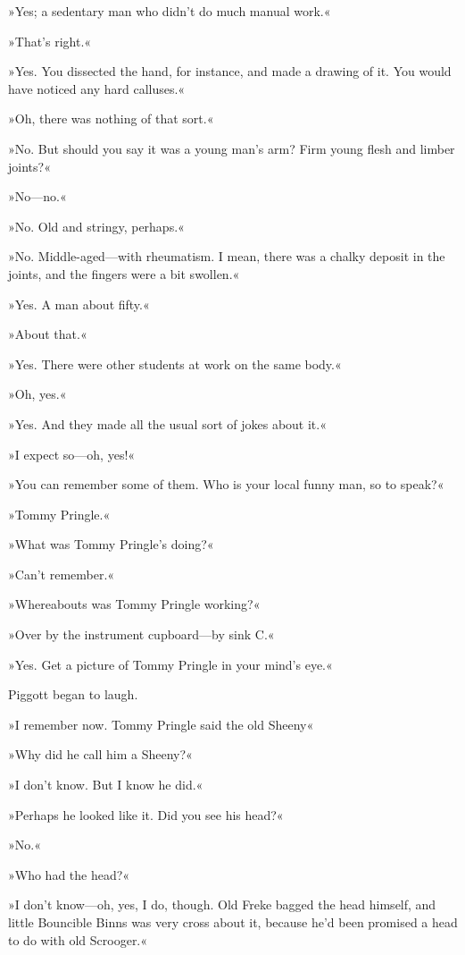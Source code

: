 »Yes; a sedentary man who didn't do much manual work.«

»That's right.«

»Yes. You dissected the hand, for instance, and made a drawing of it. You would have noticed any hard calluses.«

»Oh, there was nothing of that sort.«

»No. But should you say it was a young man's arm? Firm young flesh and limber joints?«

»No\allowbreak---\allowbreak no.«

»No. Old and stringy, perhaps.«

»No. Middle-aged\allowbreak---\allowbreak with rheumatism. I mean, there was a chalky deposit in the joints, and the fingers were a bit swollen.«

»Yes. A man about fifty.«

»About that.«

»Yes. There were other students at work on the same body.«

»Oh, yes.«

»Yes. And they made all the usual sort of jokes about it.«

»I expect so\allowbreak---\allowbreak oh, yes!«

»You can remember some of them. Who is your local funny man, so to speak?«

»Tommy Pringle.«

»What was Tommy Pringle's doing?«

»Can't remember.«

»Whereabouts was Tommy Pringle working?«

»Over by the instrument cupboard\allowbreak---\allowbreak by sink C.«

»Yes. Get a picture of Tommy Pringle in your mind's eye.«

Piggott began to laugh.

»I remember now. Tommy Pringle said the old Sheeny\longdash«

»Why did he call him a Sheeny?«

»I don't know. But I know he did.«

»Perhaps he looked like it. Did you see his head?«

»No.«

»Who had the head?«

»I don't know\allowbreak---\allowbreak oh, yes, I do, though. Old Freke bagged the head himself, and little Bouncible Binns was very cross about it, because he'd been promised a head to do with old Scrooger.«

